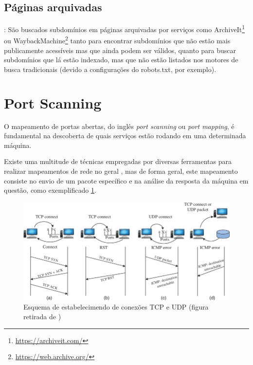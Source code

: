         \subsection{Páginas arquivadas}: São buscados subdomínios em páginas arquivadas por serviços como ArchiveIt\footnote{\url{https://archiveit.com/}} ou WaybackMachine\footnote{\url{https://web.archive.org/}} tanto para encontrar subdomínios que não estão mais publicamente acessíveis mas que ainda podem ser válidos, quanto para buscar subdomínios que lá estão indexado, mas que não estão listados nos motores de busca tradicionais (devido a configurações do robots.txt, por exemplo).


\section{Port Scanning}

O mapeamento de portas abertas, do inglês \textit{port scanning} ou \textit{port mapping}, é fundamental na descoberta de quais serviços estão rodando em uma determinada máquina. 

Existe uma multitude de técnicas empregadas por diversas ferramentas para realizar mapeamentos de rede no geral \citep{de1999review}, mas de forma geral, este mapeamento consiste no envio de um pacote específico e na análise da resposta da máquina em questão, como exemplificado 
\ref{fig:tcpudp}.

\begin{figure}[H]
    \includegraphics[scale=0.5]{figuras/tcp_connection_scheme.png}
    \caption{Esquema de estabelecimendo de conexões TCP e UDP (figura retirada de \cite{tcpudpscans}) \label{fig:tcpudp}}
\end{figure}



